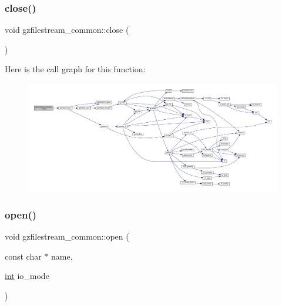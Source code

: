 \subsubsection{\texorpdfstring{close()}{close()}}
{\footnotesize\ttfamily void gzfilestream\+\_\+common\+::close (\begin{DoxyParamCaption}{ }\end{DoxyParamCaption})}

Here is the call graph for this function\+:
\nopagebreak
\begin{figure}[H]
\begin{center}
\leavevmode
\includegraphics[width=350pt]{classgzfilestream__common_a87aa2bfaf8876e1d63edafb7515aaf5f_cgraph}
\end{center}
\end{figure}
\mbox{\label{classgzfilestream__common_a642732c6ddbdc437ea996acecf7d419b}} 
\subsubsection{\texorpdfstring{open()}{open()}}
{\footnotesize\ttfamily void gzfilestream\+\_\+common\+::open (\begin{DoxyParamCaption}\item[{const char $\ast$}]{name,  }\item[{\mbox{\hyperlink{ioapi_8h_a787fa3cf048117ba7123753c1e74fcd6}{int}}}]{io\+\_\+mode }\end{DoxyParamCaption})}

